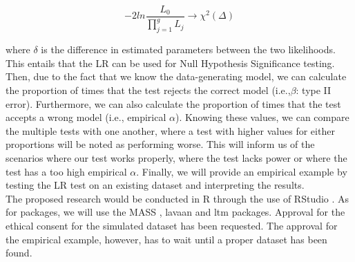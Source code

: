 \documentclass{article}
\begin{document}
\begin{equation}
- 2ln\frac{L_0}{\prod_{j = 1}^g L_j} \rightarrow \chi^{2}(\Delta)
\end{equation}

where $\delta$ is the difference in estimated parameters between the two likelihoods. This entails that the LR can be used for Null Hypothesis Significance testing. Then, due to the fact that we know the data-generating model, we can calculate the proportion of times that the test rejects the correct model (i.e.,$\beta$: type II error). Furthermore, we can also calculate the proportion of times that the test accepts a wrong model (i.e., empirical $\alpha$). Knowing these values, we can compare the multiple tests with one another, where a test with higher values for either proportions will be noted as performing worse. This will inform us of the scenarios where our test works properly, where the test lacks power or where the test has a too high empirical $\alpha$. Finally, we will provide an empirical example by testing the LR test on an existing dataset and interpreting the results. \\
\indent The proposed research would be conducted in R \autocite{R} through the use of RStudio \autocite{Rstudio}. As for packages, we will use the MASS \autocite{mass}, lavaan \autocite{lavaan} and ltm \autocite{ltmpack} packages. Approval for the ethical consent for the simulated dataset has been requested. The approval for the empirical example, however, has to wait until a proper dataset has been found.


\nocite{*}

\newpage
\printbibliography
\end{document}
